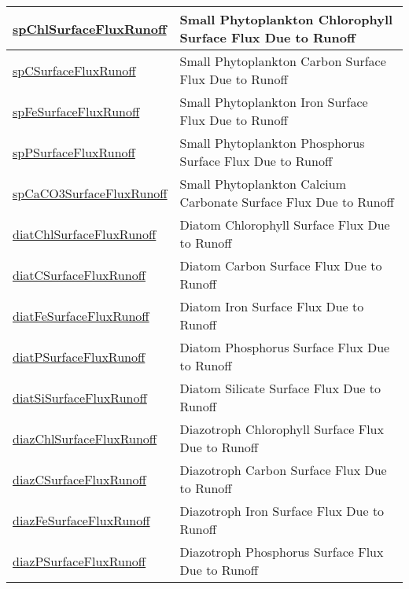 {\begin{center}
\begin{longtable}{| p{2.0in} | p{4.0in} |}
    \hline
    \hyperref[subsec:var_sec_forcing_spChlSurfaceFluxRunoff]{spChlSurfaceFluxRunoff} & Small Phytoplankton Chlorophyll Surface Flux Due to Runoff \\
    \hline
    \hyperref[subsec:var_sec_forcing_spCSurfaceFluxRunoff]{spCSurfaceFluxRunoff} & Small Phytoplankton Carbon Surface Flux Due to Runoff \\
    \hline
    \hyperref[subsec:var_sec_forcing_spFeSurfaceFluxRunoff]{spFeSurfaceFluxRunoff} & Small Phytoplankton Iron Surface Flux Due to Runoff \\
    \hline
    \hyperref[subsec:var_sec_forcing_spPSurfaceFluxRunoff]{spPSurfaceFluxRunoff} & Small Phytoplankton Phosphorus Surface Flux Due to Runoff \\
    \hline
    \hyperref[subsec:var_sec_forcing_spCaCO3SurfaceFluxRunoff]{spCaCO3SurfaceFluxRunoff} & Small Phytoplankton Calcium Carbonate Surface Flux Due to Runoff \\
    \hline
    \hyperref[subsec:var_sec_forcing_diatChlSurfaceFluxRunoff]{diatChlSurfaceFluxRunoff} & Diatom Chlorophyll Surface Flux Due to Runoff \\
    \hline
    \hyperref[subsec:var_sec_forcing_diatCSurfaceFluxRunoff]{diatCSurfaceFluxRunoff} & Diatom Carbon Surface Flux Due to Runoff \\
    \hline
    \hyperref[subsec:var_sec_forcing_diatFeSurfaceFluxRunoff]{diatFeSurfaceFluxRunoff} & Diatom Iron Surface Flux Due to Runoff \\
    \hline
    \hyperref[subsec:var_sec_forcing_diatPSurfaceFluxRunoff]{diatPSurfaceFluxRunoff} & Diatom Phosphorus Surface Flux Due to Runoff \\
    \hline
    \hyperref[subsec:var_sec_forcing_diatSiSurfaceFluxRunoff]{diatSiSurfaceFluxRunoff} & Diatom Silicate Surface Flux Due to Runoff \\
    \hline
    \hyperref[subsec:var_sec_forcing_diazChlSurfaceFluxRunoff]{diazChlSurfaceFluxRunoff} & Diazotroph Chlorophyll Surface Flux Due to Runoff \\
    \hline
    \hyperref[subsec:var_sec_forcing_diazCSurfaceFluxRunoff]{diazCSurfaceFluxRunoff} & Diazotroph Carbon Surface Flux Due to Runoff \\
    \hline
    \hyperref[subsec:var_sec_forcing_diazFeSurfaceFluxRunoff]{diazFeSurfaceFluxRunoff} & Diazotroph Iron Surface Flux Due to Runoff \\
    \hline
    \hyperref[subsec:var_sec_forcing_diazPSurfaceFluxRunoff]{diazPSurfaceFluxRunoff} & Diazotroph Phosphorus Surface Flux Due to Runoff \\

\end{longtable}
\end{center}}
